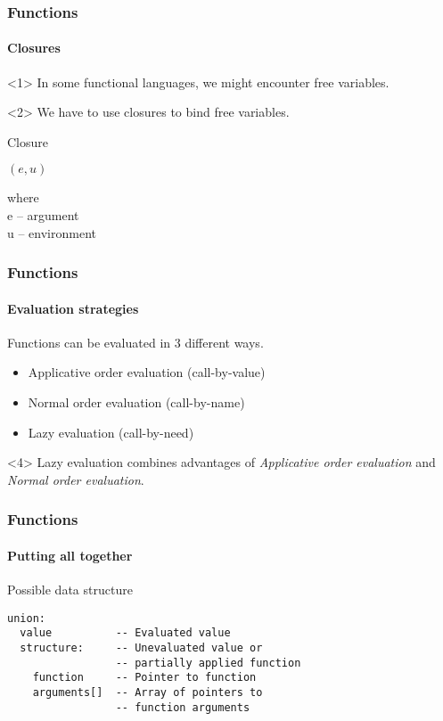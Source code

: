 \documentclass{beamer}
\newcommand{\vpad}{\vspace{5pt}}
\begin{document}
\begin{frame} \frametitle{Functions}
  \framesubtitle{Closures}

  \begin{onlyenv}<1>
    In some functional languages, we might encounter free variables.

    \begin{block}{}
      \freeVar
    \end{block}
  \end{onlyenv}
  \begin{onlyenv}<2>
    We have to use closures to bind free variables.

    \begin{block}{Closure}
      \begin{center}
        $(e, u)$
      \end{center}
      where \\
      \hspace{3pt} e -- argument \\
      \hspace{3pt} u -- environment
      \vpad
    \end{block}
  \end{onlyenv}

\end{frame}

\begin{frame} \frametitle{Functions}
  \framesubtitle{Evaluation strategies}

  Functions can be evaluated in 3 different ways.
  \begin{itemize}
    \item<2-> Applicative order evaluation (call-by-value)
    \item<3-> Normal order evaluation (call-by-name)
    \item<4-> Lazy evaluation (call-by-need)
  \end{itemize}

  \vpad
  \begin{block}{}<4>
  Lazy evaluation combines advantages of \textit{Applicative order evaluation}
  and \textit{Normal order evaluation}.
  \end{block}

\end{frame}

\begin{frame}[fragile] \frametitle{Functions}
  \framesubtitle{Putting all together}

  \begin{block}{Possible data structure}
    \begin{verbatim}
union:
  value          -- Evaluated value
  structure:     -- Unevaluated value or
                 -- partially applied function
    function     -- Pointer to function
    arguments[]  -- Array of pointers to
                 -- function arguments
    \end{verbatim}
  \end{block}
\end{frame}
\end{document}
